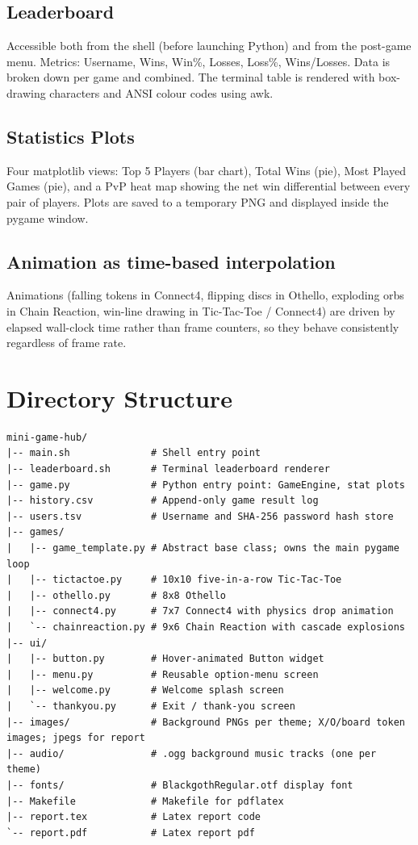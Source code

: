 \documentclass[12pt]{article}
\begin{document}
\subsection{Leaderboard}
Accessible both from the shell (before launching Python) and from the post-game menu. Metrics: Username, Wins, Win\%, Losses, Loss\%, Wins/Losses. Data is broken down per game and combined. The terminal table is rendered with box-drawing characters and ANSI colour codes using awk.

\subsection{Statistics Plots}
Four matplotlib views: Top 5 Players (bar chart), Total Wins (pie), Most Played Games (pie), and a PvP heat map showing the net win differential between every pair of players. Plots are saved to a temporary PNG and displayed inside the pygame window.

\subsection{Animation as time-based interpolation} Animations (falling tokens in Connect4, flipping discs in Othello, exploding orbs in Chain Reaction, win-line drawing in Tic-Tac-Toe / Connect4) are driven by elapsed wall-clock time rather than frame counters, so they behave consistently regardless of frame rate.
\newpage
\section{Directory Structure}

\begin{lstlisting}
mini-game-hub/
|-- main.sh              # Shell entry point
|-- leaderboard.sh       # Terminal leaderboard renderer
|-- game.py              # Python entry point: GameEngine, stat plots
|-- history.csv          # Append-only game result log
|-- users.tsv            # Username and SHA-256 password hash store
|-- games/
|   |-- game_template.py # Abstract base class; owns the main pygame loop
|   |-- tictactoe.py     # 10x10 five-in-a-row Tic-Tac-Toe
|   |-- othello.py       # 8x8 Othello 
|   |-- connect4.py      # 7x7 Connect4 with physics drop animation
|   `-- chainreaction.py # 9x6 Chain Reaction with cascade explosions
|-- ui/
|   |-- button.py        # Hover-animated Button widget
|   |-- menu.py          # Reusable option-menu screen
|   |-- welcome.py       # Welcome splash screen
|   `-- thankyou.py      # Exit / thank-you screen
|-- images/              # Background PNGs per theme; X/O/board token images; jpegs for report
|-- audio/               # .ogg background music tracks (one per theme)
|-- fonts/               # BlackgothRegular.otf display font
|-- Makefile             # Makefile for pdflatex
|-- report.tex           # Latex report code
`-- report.pdf           # Latex report pdf

\end{lstlisting}
\end{document}
